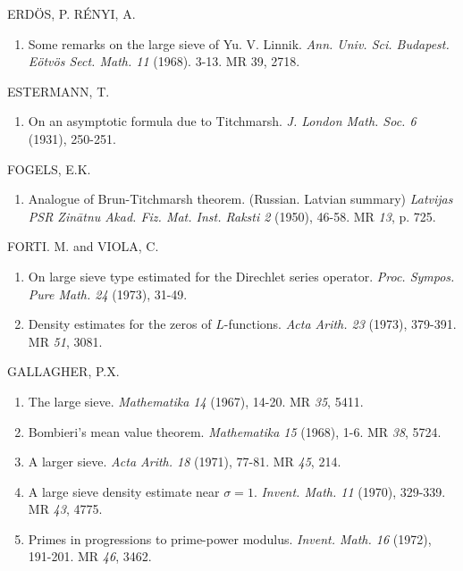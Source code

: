 \begin{thebibliography}{99}
 ERD\"{O}S, P. R\'ENYI, A.
\begin{enumerate}
\item Some remarks on the large sieve of
  Yu. V. Linnik. \textit{Ann. Univ. Sci. Budapest. E\"otv\"os
    Sect. Math. 11} (1968). 3-13. MR 39, 2718.
\end{enumerate}

 ESTERMANN, T.\pageoriginale
\begin{enumerate}
\item On an asymptotic formula due to Titchmarsh. \textit{J. London
  Math. Soc. 6} (1931), 250-251. 
\end{enumerate}

 FOGELS, E.K.
\begin{enumerate}
\item Analogue of Brun-Titchmarsh theorem. (Russian. Latvian summary)
  \textit{Latvijas PSR Zin\=atnu Akad. Fiz. Mat. Inst. Raksti 2}
  (1950), 46-58. MR {\em 13}, p. 725.
\end{enumerate}

 FORTI. M. and VIOLA, C.
\begin{enumerate}
\item On large sieve type estimated for the Direchlet series
  operator. \textit{Proc. Sympos. Pure Math. 24} (1973), 31-49.

\item Density estimates for the zeros of $L$-functions. \textit{Acta
  Arith. 23} (1973), 379-391. MR {\em 51}, 3081.
\end{enumerate}

 GALLAGHER, P.X.
\begin{enumerate}
\item The large sieve. \textit{Mathematika 14} (1967), 14-20. MR {\em
  35}, 5411.

\item Bombieri's mean value theorem. \textit{Mathematika 15} (1968),
  1-6. MR {\em 38}, 5724.

\item A larger sieve. \textit{Acta Arith. 18} (1971), 77-81. MR {\em
  45}, 214.

\item A large sieve density estimate near $\sigma =
  1$. \textit{Invent. Math. 11} (1970), 329-339. MR {\em 43}, 4775.

\item Primes in progressions to prime-power
  modulus. \textit{Invent. Math. 16} (1972), 191-201. MR {\em 46}, 3462. 


\end{enumerate}
\end{thebibliography}
